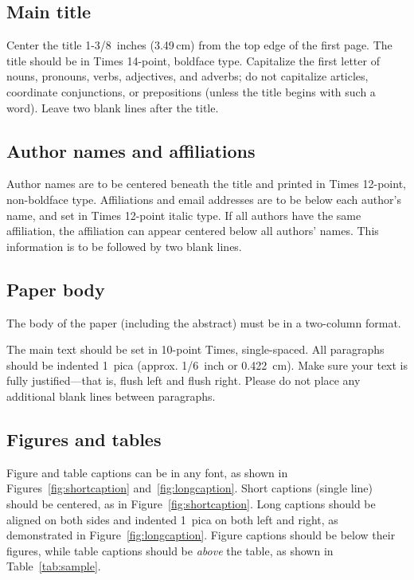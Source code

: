 \documentclass[10pt,twocolumn]{article}
\begin{document}
\subsection{Main title}

Center the title 1-3/8~inches (3.49\,cm) from the top edge of the
first page. The title should be in Times 14-point, boldface type.
Capitalize the first letter of nouns, pronouns, verbs, adjectives, and
adverbs; do not capitalize articles, coordinate conjunctions, or
prepositions (unless the title begins with such a word). Leave two
blank lines after the title.

\subsection{Author names and affiliations}

Author names are to be centered beneath the title and printed in Times
12-point, non-boldface type.  Affiliations and email addresses are to
be below each author's name, and set in Times 12-point italic type.
If all authors have the same affiliation, the affiliation can appear
centered below all authors' names.
This information is to be followed by two blank lines.

\subsection{Paper body}

The body of the paper (including the abstract) must be in a two-column
format.

The main text should be set in 10-point Times, single-spaced.  All
paragraphs should be indented 1~pica (approx. 1/6~inch or
0.422~cm). Make sure your text is fully justified---that is, flush
left and flush right. Please do not place any additional blank lines
between paragraphs.

\subsection{Figures and tables}

Figure and table captions can be in any font, as shown in
Figures~\ref{fig:shortcaption} and~\ref{fig:longcaption}.  Short
captions (single line) should be centered, as in
Figure~\ref{fig:shortcaption}.  Long captions should be aligned on
both sides and indented 1~pica on both left and right, as demonstrated
in Figure~\ref{fig:longcaption}.  Figure captions should be below
their figures, while table captions should be \emph{above} the table,
as shown in Table~\ref{tab:sample}.
\end{document}
